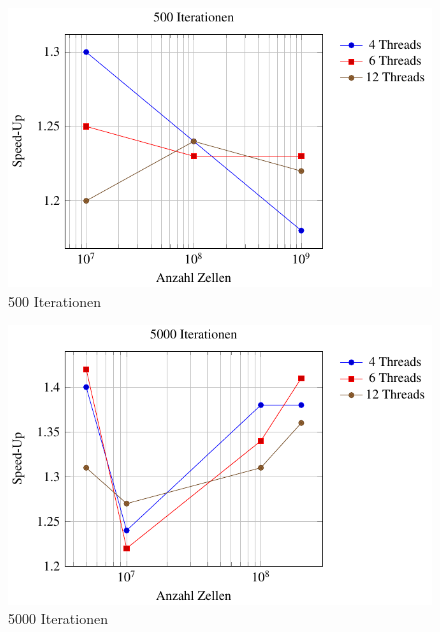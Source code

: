 	\begin{figure}
		\centering
		\includegraphics{papers/parallelisierung/images/speedup500.pdf}
		\caption{500 Iterationen}
		\label{parallelisierung:fig:Speedup500}
	\end{figure}
	
	
	\begin{figure}
		\centering
		\includegraphics{papers/parallelisierung/images/speedup5000.pdf}
		\caption{5000 Iterationen}
		\label{parallelisierung:fig:Speedup5000}
	\end{figure}
	

